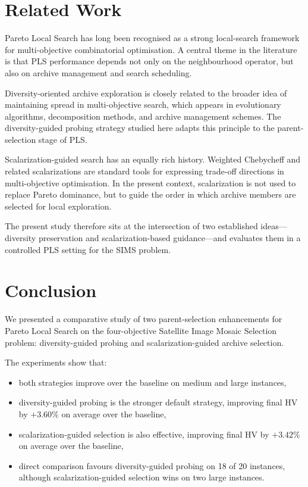 \documentclass[11pt,a4paper]{article}
\begin{document}
\section{Related Work}\label{sec:related}

Pareto Local Search has long been recognised as a strong local-search
framework for multi-objective combinatorial optimisation.  A central
theme in the literature is that PLS performance depends not only on the
neighbourhood operator, but also on archive management and search
scheduling.

Diversity-oriented archive exploration is closely related to the broader
idea of maintaining spread in multi-objective search, which appears in
evolutionary algorithms, decomposition methods, and archive management
schemes.  The diversity-guided probing strategy studied here adapts this
principle to the parent-selection stage of PLS.

Scalarization-guided search has an equally rich history.  Weighted
Chebycheff and related scalarizations are standard tools for expressing
trade-off directions in multi-objective optimisation.  In the present
context, scalarization is not used to replace Pareto dominance, but to
guide the order in which archive members are selected for local
exploration.

The present study therefore sits at the intersection of two established
ideas---diversity preservation and scalarization-based guidance---and
evaluates them in a controlled PLS setting for the SIMS problem.

\section{Conclusion}\label{sec:conclusion}

We presented a comparative study of two parent-selection enhancements
for Pareto Local Search on the four-objective Satellite Image Mosaic
Selection problem: diversity-guided probing and scalarization-guided
archive selection.

The experiments show that:
\begin{itemize}
  \item both strategies improve over the baseline on medium and large
    instances,
  \item diversity-guided probing is the stronger default strategy,
    improving final HV by \(+3.60\%\) on average over the baseline,
  \item scalarization-guided selection is also effective, improving final
    HV by \(+3.42\%\) on average over the baseline,
  \item direct comparison favours diversity-guided probing on 18 of 20
    instances, although scalarization-guided selection wins on two large
    instances.
\end{itemize}
\end{document}
